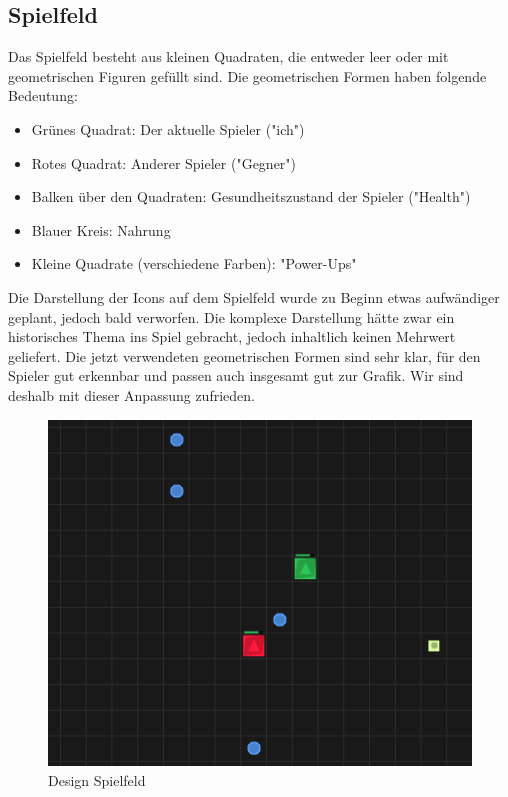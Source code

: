 \documentclass[11pt,a4paper,titlepage]{article}
\begin{document}
\subsection{Spielfeld}

Das Spielfeld besteht aus kleinen Quadraten, die entweder leer oder mit geometrischen Figuren gefüllt sind. Die geometrischen Formen haben folgende Bedeutung:
\begin{itemize}
\item Grünes Quadrat: Der aktuelle Spieler ("ich")
\item Rotes Quadrat: Anderer Spieler ("Gegner")
\item Balken über den Quadraten: Gesundheitszustand der Spieler ("Health")
\item Blauer Kreis: Nahrung
\item Kleine Quadrate (verschiedene Farben): "Power-Ups"
\end{itemize}

Die Darstellung der Icons auf dem Spielfeld wurde zu Beginn etwas aufwändiger geplant, jedoch bald verworfen. Die komplexe Darstellung hätte zwar ein historisches Thema ins Spiel gebracht, jedoch inhaltlich keinen Mehrwert geliefert. Die jetzt verwendeten geometrischen Formen sind sehr klar, für den Spieler gut erkennbar und passen auch insgesamt gut zur Grafik. Wir sind deshalb mit dieser Anpassung zufrieden.

\begin{figure}[H]
	\includegraphics[width=\textwidth]{game1.png}
	\caption{Design Spielfeld}
\end{figure}
\end{document}
